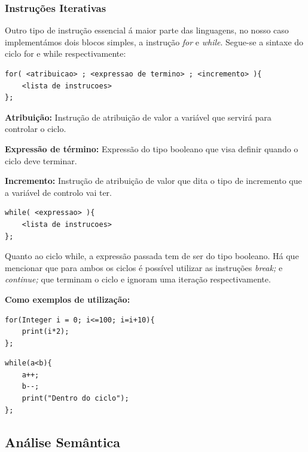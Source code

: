 \documentclass[10pt,portuguese]{article}
\begin{document}
\subsubsection{Instruções Iterativas}
\par Outro tipo de instrução essencial á maior parte das linguagens, no nosso caso implementámos dois blocos simples, a instrução \emph{for} e \emph{while}. Segue-se a sintaxe do ciclo for e while respectivamente:
\begin{lstlisting}[numbers=none]
for( <atribuicao> ; <expressao de termino> ; <incremento> ){
    <lista de instrucoes>
};
\end{lstlisting}
\newline
\par \textbf{Atribuição:} Instrução de atribuição de valor a variável que servirá para controlar o ciclo.
\par \textbf{Expressão de término:} Expressão do tipo booleano que visa definir quando o ciclo deve terminar.
\par \textbf{Incremento:} Instrução de atribuição de valor que dita o tipo de incremento que a variável de controlo vai ter.
\newline
\begin{lstlisting}[numbers=none]
while( <expressao> ){
    <lista de instrucoes>
};
\end{lstlisting}
\newline
\par Quanto ao ciclo while, a expressão passada tem de ser do tipo booleano. Há que mencionar que para ambos os ciclos é possível utilizar as instruções \emph{break;} e \emph{continue;} que terminam o ciclo e ignoram uma iteração respectivamente.
\newline
\par \textbf{Como exemplos de utilização:}
\begin{lstlisting}[numbers=none]
for(Integer i = 0; i<=100; i=i+10){
    print(i*2);
};
\end{lstlisting}
\newline
\begin{lstlisting}[numbers=none]
while(a<b){
    a++;
    b--;
    print("Dentro do ciclo");
};
\end{lstlisting}
\subsection{Análise Semântica}
\end{document}
